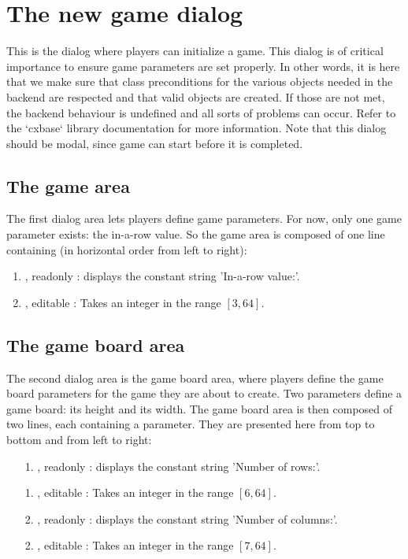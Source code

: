 \section{The new game dialog} \label{dlg:NewGame}
This is the dialog where players can initialize a game. This dialog is of critical
importance to ensure game parameters are set properly. In other words, it is here
that we make sure that class preconditions for the various objects needed in the
backend are respected and that valid objects are created. If those are not met,
the backend behaviour is undefined and all sorts of problems can occur. Refer to
the `cxbase` library documentation for more information. Note that this dialog
should be modal, since game can start before it is completed.


  \subsection{The game area}
  The first dialog area lets players define game parameters. For now, only one game
  parameter exists: the in-a-row value. So the game area is composed of one line
  containing (in horizontal order from left to right):

  \begin{enumerate}
    \item {}   , readonly : displays the constant string 'In-a-row value:'.
    \item {}, editable : Takes an integer in the range $[3, 64]$.
  \end{enumerate}


  \subsection{The game board area}
  The second dialog area is the game board area, where players define the game
  board parameters for the game they are about to create. Two parameters define
  a game board: its height and its width. The game board area is then composed
  of two lines, each containing a parameter. They are presented here from top
  to bottom and from left to right:

  \begin{enumerate}
    \item[1.]    , readonly : displays the constant string 'Number of
                                         rows:'.
    \item[1.] , editable : Takes an integer in the range $[6, 64]$.
    \item[2.]    , readonly : displays the constant string 'Number of
                                         columns:'.
    \item[2.] , editable : Takes an integer in the range $[7, 64]$.
  \end{enumerate}


